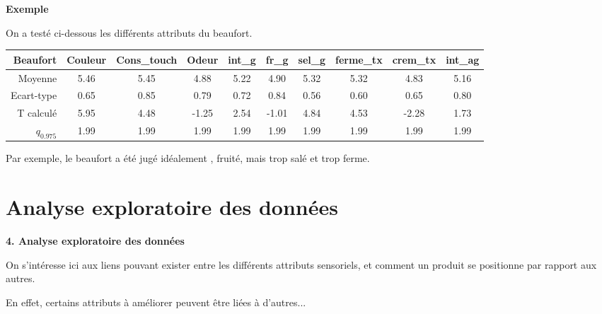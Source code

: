 \documentclass[aspectratio=169,xcolor=dvipsnames]{beamer}
\begin{document}
\begin{frame}
	\begin{exampleblock}{\textbf{Exemple}}
	\begin{scriptsize}
	On a testé ci-dessous les différents attributs du beaufort.
	
\begin{center}
\begin{tabular}{r|ccccccccc}
Beaufort & Couleur & Cons\_touch & Odeur & int\_g & fr\_g & sel\_g & ferme\_tx & crem\_tx & int\_ag \\ 
\hline
  Moyenne & 5.46 & 5.45 & 4.88 & 5.22 & 4.90 & 5.32 & 5.32 & 4.83 & 5.16 \\ 
  Ecart-type & 0.65 & 0.85 & 0.79 & 0.72 & 0.84 & 0.56 & 0.60 & 0.65 & 0.80 \\ 
  T calculé &  5.95 &  4.48 & -1.25 &  2.54 & -1.01 &  4.84 &  4.53 & -2.28 &  1.73 \\ 
  $q_{0.975}$ & 1.99 & 1.99 & 1.99 & 1.99 &  1.99 &  1.99 &  1.99 &  1.99 &  1.99
\end{tabular}
\end{center}

	Par exemple, le beaufort a été jugé \og idéalement \fg{}, fruité, mais trop salé et trop ferme.
	\end{scriptsize}
	\end{exampleblock}
\end{frame}

\section{Analyse exploratoire des données}

\begin{frame}[plain]

\vfill

\begin{center}
{\huge \textcolor{nyubluedark}{\textbf{4. Analyse exploratoire des données}}}
\end{center}

\vfill

\end{frame}

\begin{frame}

\vfill

\textcolor{nyubluedarker}{\faCogs} On s'intéresse ici aux liens pouvant exister entre les différents attributs sensoriels, et comment un produit se positionne par rapport aux autres.

\vfill

\textcolor{nyubluedarker}{\faLightbulb[regular]} En effet, certains attributs à améliorer peuvent être liées à d'autres...

\vfill

\end{frame}
\end{document}
